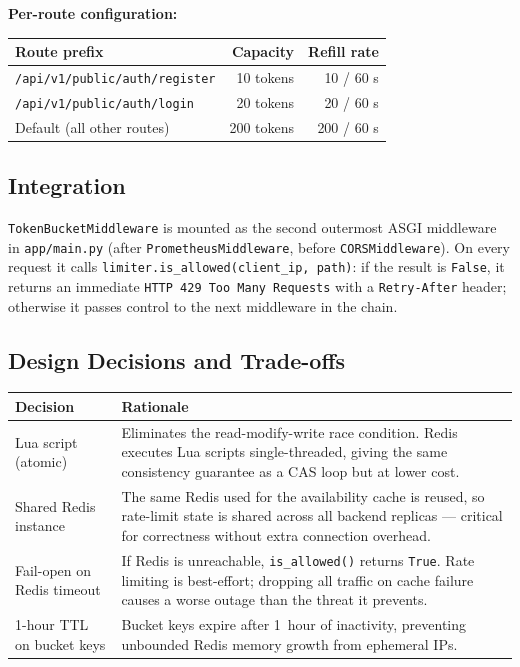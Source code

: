 \documentclass[12pt,a4paper]{article}
\begin{document}
\textbf{Per-route configuration:}

\begin{table}[H]
\centering\small
\begin{tabular}{@{} l r r @{}}
\toprule
\textbf{Route prefix} & \textbf{Capacity} & \textbf{Refill rate} \\
\midrule
\texttt{/api/v1/public/auth/register} & 10 tokens  & 10 / 60 s  \\
\texttt{/api/v1/public/auth/login}    & 20 tokens  & 20 / 60 s  \\
Default (all other routes)            & 200 tokens & 200 / 60 s \\
\bottomrule
\end{tabular}
\end{table}

\subsection{Integration}

\texttt{TokenBucketMiddleware} is mounted as the second outermost ASGI middleware in \texttt{app/main.py} (after \texttt{PrometheusMiddleware}, before \texttt{CORSMiddleware}). On every request it calls \texttt{limiter.is\_allowed(client\_ip,~path)}: if the result is \texttt{False}, it returns an immediate \texttt{HTTP~429~Too~Many~Requests} with a \texttt{Retry-After} header; otherwise it passes control to the next middleware in the chain.

\subsection{Design Decisions and Trade-offs}

\begin{table}[H]
\centering\small
\begin{tabularx}{\linewidth}{@{} l X @{}}
\toprule
\textbf{Decision} & \textbf{Rationale} \\
\midrule
Lua script (atomic) & Eliminates the read-modify-write race condition. Redis executes Lua scripts single-threaded, giving the same consistency guarantee as a CAS loop but at lower cost. \\[3pt]
Shared Redis instance & The same Redis used for the availability cache is reused, so rate-limit state is shared across all backend replicas --- critical for correctness without extra connection overhead. \\[3pt]
Fail-open on Redis timeout & If Redis is unreachable, \texttt{is\_allowed()} returns \texttt{True}. Rate limiting is best-effort; dropping all traffic on cache failure causes a worse outage than the threat it prevents. \\[3pt]
1-hour TTL on bucket keys & Bucket keys expire after 1~hour of inactivity, preventing unbounded Redis memory growth from ephemeral IPs. \\
\bottomrule
\end{tabularx}
\end{table}
\end{document}
